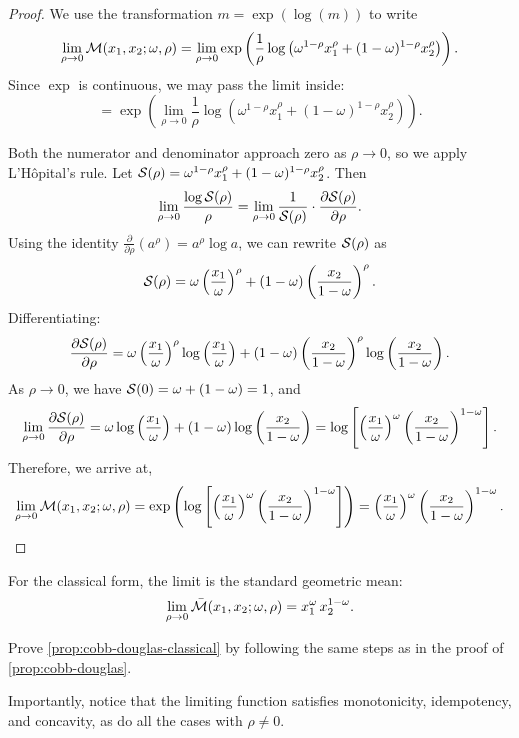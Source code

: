 \begin{proof}
We use the transformation $m = \exp(\log(m))$ to write
\[
\lim_{\rho \to 0} \mathcal{M}(x_1, x_2; \omega, \rho) = \lim_{\rho \to 0} \exp\left( \frac{1}{\rho} \log\left( \omega^{1-\rho} x_1^\rho + (1-\omega)^{1-\rho} x_2^\rho \right) \right).
\]
Since $\exp$ is continuous, we may pass the limit inside:
\[
= \exp\left( \lim_{\rho \to 0} \frac{1}{\rho} \log\left( \omega^{1-\rho} x_1^\rho + (1-\omega)^{1-\rho} x_2^\rho \right) \right).
\]

Both the numerator and denominator approach zero as $\rho \to 0$, so we apply L'Hôpital's rule. Let $\mathcal{S}(\rho) = \omega^{1-\rho} x_1^\rho + (1-\omega)^{1-\rho} x_2^\rho$. Then
\[
\lim_{\rho \to 0} \frac{\log \mathcal{S}(\rho)}{\rho} = \lim_{\rho \to 0} \frac{1}{\mathcal{S}(\rho)} \cdot \frac{\partial \mathcal{S}(\rho)}{\partial \rho}.
\]
Using the identity $\frac{\partial}{\partial \rho}(a^\rho) = a^\rho \log a$, we can rewrite $\mathcal{S}(\rho)$ as
\[
\mathcal{S}(\rho) = \omega \left( \frac{x_1}{\omega} \right)^\rho + (1-\omega) \left( \frac{x_2}{1-\omega} \right)^\rho.
\]
Differentiating:
\[
\frac{\partial \mathcal{S}(\rho)}{\partial \rho} = \omega \left( \frac{x_1}{\omega} \right)^\rho \log\left( \frac{x_1}{\omega} \right) + (1-\omega) \left( \frac{x_2}{1-\omega} \right)^\rho \log\left( \frac{x_2}{1-\omega} \right).
\]
As $\rho \to 0$, we have $\mathcal{S}(0) = \omega + (1-\omega) = 1$, and
\[
\lim_{\rho \to 0} \frac{\partial \mathcal{S}(\rho)}{\partial \rho} = \omega \log\left( \frac{x_1}{\omega} \right) + (1-\omega) \log\left( \frac{x_2}{1-\omega} \right) = \log\left[ \left( \frac{x_1}{\omega} \right)^\omega \left( \frac{x_2}{1-\omega} \right)^{1-\omega} \right].
\]
Therefore, we arrive at,
\[
\lim_{\rho \to 0} \mathcal{M}(x_1, x_2; \omega, \rho) = \exp\left( \log\left[ \left( \frac{x_1}{\omega} \right)^\omega \left( \frac{x_2}{1-\omega} \right)^{1-\omega} \right] \right) = \left( \frac{x_1}{\omega} \right)^\omega \left( \frac{x_2}{1-\omega} \right)^{1-\omega}.
\]
\end{proof}
\begin{proposition}
\label{prop:cobb-douglas-classical}
For the classical form, the limit is the standard geometric mean:
\begin{equation}
\label{eq:cobb-douglas-classical}
\lim_{\rho \to 0} \bar{\mathcal{M}}(x_1, x_2; \omega, \rho) = x_1^\omega \, x_2^{1-\omega}.
\end{equation}
\end{proposition}

\begin{callouttip}[Exercise]
Prove \cref{prop:cobb-douglas-classical} by following the same steps as in the proof of \cref{prop:cobb-douglas}.
\end{callouttip}
Importantly, notice that the limiting function satisfies monotonicity, idempotency, and concavity, as do all the cases with $\rho\not=0.$ 

